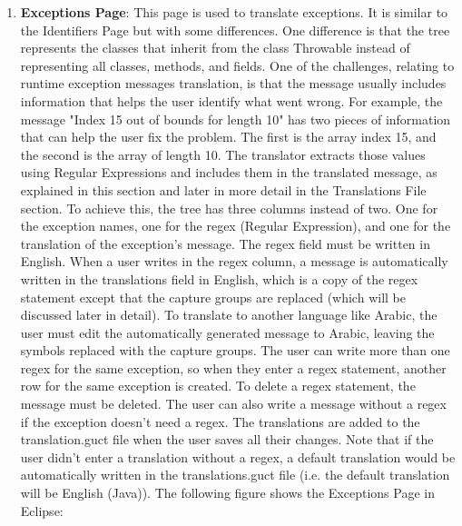 \begin{enumerate}
    \item \textbf{Exceptions Page}: This page is used to translate exceptions. It is similar to the Identifiers Page but with some differences. One difference is that the tree represents the classes that inherit from the class Throwable instead of representing all classes, methods, and fields. One of the challenges, relating to runtime exception messages translation, is that the message usually includes information that helps the user identify what went wrong. For example, the message "Index 15 out of bounds for length 10" has two pieces of information that can help the user fix the problem. The first is the array index 15, and the second is the array of length 10. The translator extracts those values using Regular Expressions and includes them in the translated message, as explained in this section and later in more detail in the Translations File section. To achieve this, the tree has three columns instead of two. One for the exception names, one for the regex (Regular Expression), and one for the translation of the exception's message. The regex field must be written in English. When a user writes in the regex column, a message is automatically written in the translations field in English, which is a copy of the regex statement except that the capture groups are replaced (which will be discussed later in detail). To translate to another language like Arabic, the user must edit the automatically generated message to Arabic, leaving the symbols replaced with the capture groups. The user can write more than one regex for the same exception, so when they enter a regex statement, another row for the same exception is created. To delete a regex statement, the message must be deleted. The user can also write a message without a regex if the exception doesn't need a regex. The translations are added to the translation.guct file when the user saves all their changes. Note that if the user didn't enter a translation without a regex, a default translation would be automatically written in the translations.guct file (i.e. the default translation will be English (Java)). The following figure shows the Exceptions Page in Eclipse:


\end{enumerate}
